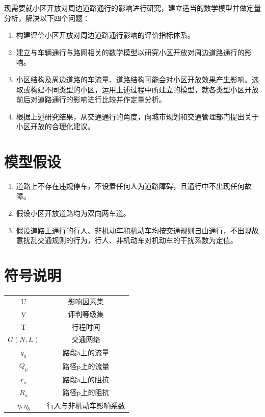 \documentclass[fontset=windows,a4paper,12pt]{ctexart}
\begin{document}
	现需要就小区开放对周边道路通行的影响进行研究，建立适当的数学模型并做定量分析，解决以下四个问题：
\begin{enumerate}
	\item 构建评价小区开放对周边道路通行影响的评价指标体系。
	\item 建立与车辆通行与路网相关的数学模型以研究小区开放对周边道路通行的影响。
	\item 小区结构及周边道路的车流量、道路结构可能会对小区开放效果产生影响。选取或构建不同类型的小区，运用上述过程中所建立的模型，就各类型小区开放前后对道路通行的影响进行比较并作定量分析。
	\item 根据上述研究结果，从交通通行的角度，向城市规划和交通管理部门提出关于小区开放的合理化建议。
\end{enumerate}
  \section{模型假设}
  \begin{enumerate}
  	\item 道路上不存在违规停车，不设置任何人为道路障碍，且通行中不出现任何故障。
  	\item 假设小区开放道路均为双向两车道。
  	\item 假设道路上通行的行人、非机动车和机动车均按交通规则自由通行，不出现故意扰乱交通规则的行为，行人、非机动车对机动车的干扰系数为定值。
  \end{enumerate}
  \section{符号说明}
  \begin{tabular}{c|c}
	\toprule[1pt]
	\makebox[0.4\textwidth][c]{符号}	&  \makebox[0.5\textwidth][c]{意义} \\ \hline
	U				&	影响因素集\\
	V				&	评判等级集\\
	T				&	行程时间\\
	$G(N,L)$		&	交通网络\\
	$q_a$			&	路段a上的流量\\
	$Q_p$			&	路径p上的流量\\
	$r_a$			&	路段a上的阻抗\\
	$R_a$			&	路径p上的阻抗\\
	$\eta,\eta_b$	&	行人与非机动车影响系数\\
	\bottomrule[1pt]
\end{tabular}
\end{document}
